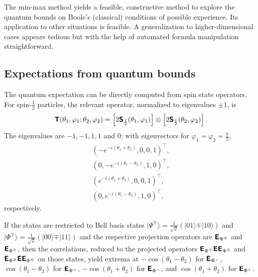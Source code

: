 \documentclass[%
  twocolumn,
 showpacs,
 showkeys,
 preprintnumbers,
 amsmath,amssymb,
 aps,
  pra,
  longbibliography,
 floatfix,
 ]{revtex4-1}
\begin{document}
The min-max method yields a feasible, constructive method to explore the quantum bounds on
Boole's (classical) conditions of possible experience.
Its application to other situations is feasible.
A generalization to higher-dimensional cases appears tedious but with the help of automated
formula manipulation straightforward.


\subsection{Expectations from quantum bounds}

The quantum expectation can be directly computed from spin state operators.
For spin-$\frac{1}{2}$ particles, the relevant operator, normalized to eigenvalues  $\pm 1$, is
\begin{equation}
\begin{split}
\textsf{\textbf{T}} (\theta_1 ,\varphi_1;\theta_2 ,\varphi_2)
=
\left[2 \textsf{\textbf{S}}_\frac{1}{2} (\theta_1 ,\varphi_1)\right]
\otimes
\left[2 \textsf{\textbf{S}}_\frac{1}{2} (\theta_2 ,\varphi_2)\right]
.
\end{split}
\label{e-2017-b-whatever-e6a}
\end{equation}
The eigenvalues are $-1,-1,1,1$ and $0$; with eigenvectors for   $\varphi_1=\varphi_2=\frac{\pi}{2}$,
\begin{equation}
\begin{split}
\left( -e^{-i (\theta_1+\theta_2)},0,0,1\right)^\intercal  ,  \\
\left( 0,-e^{-i (\theta_1-\theta_2)},1,0\right)^\intercal  ,  \\
\left( e^{-i (\theta_1+\theta_2)},0,0,1\right)^\intercal   ,  \\
\left( 0,e^{-i (\theta_1-\theta_2)},1,0 \right)^\intercal  ,
\end{split}
\label{e-2017-b-whatever-e6b}
\end{equation}
respectively.

If the states are restricted to Bell basis states
$
\vert \Psi^\mp \rangle = \frac{1}{\sqrt{2}}\left(\vert 0   1 \rangle \mp \vert 1   0 \rangle  \right)
$
and
$\vert \Phi^\mp \rangle = \frac{1}{\sqrt{2}}\left(\vert 0   0 \rangle \mp \vert 1   1 \rangle  \right)
$
and the respective projection operators are
$\textsf{\textbf{E}}_{\Psi^\mp}$ and
$\textsf{\textbf{E}}_{\Phi^\mp}$,
then the correlations, reduced to the projected operators
$\textsf{\textbf{E}}_{\Psi^\mp} \textsf{\textbf{E}} \textsf{\textbf{E}}_{\Psi^\mp} $ and
$\textsf{\textbf{E}}_{\Phi^\mp} \textsf{\textbf{E}} \textsf{\textbf{E}}_{\Phi^\mp} $
on those states,
yield extrema at
$-\cos (\theta_1-\theta_2)$ for $\textsf{\textbf{E}}_{\Psi^-}$,
$\cos (\theta_1-\theta_2)$ for $\textsf{\textbf{E}}_{\Psi^+}$,
$-\cos (\theta_1+\theta_2)$ for $\textsf{\textbf{E}}_{\Phi^-}$, and
$\cos (\theta_1+\theta_2)$ for $\textsf{\textbf{E}}_{\Phi^+}$.
\end{document}
